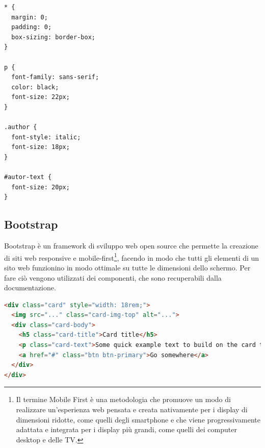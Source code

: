 \begin{lstlisting}[basicstyle=\small, caption={Esempio di utilizzo dei selettori usando CSS}, captionpos=b]
* {
  margin: 0;
  padding: 0;
  box-sizing: border-box;
}

p {
  font-family: sans-serif;
  color: black;
  font-size: 22px;
}

.author {
  font-style: italic;
  font-size: 18px;
}

#autor-text {
  font-size: 20px;
}

\end{lstlisting}

\subsection{Bootstrap}
Bootstrap è un framework di sviluppo web open source che permette la creazione di siti web responsive e mobile-first\footnote{Il termine Mobile First è una metodologia che promuove un modo di realizzare un’esperienza web pensata e creata nativamente per i display di dimensioni ridotte, come quelli degli smartphone e che viene progressivamente adattata e integrata per i display più grandi, come quelli dei computer desktop e delle TV.\cite{mobileFirst}}, facendo in modo che tutti gli elementi di un sito web funzionino in modo ottimale su tutte le dimensioni dello schermo.\cite{bootstrap}
Per fare ciò vengono utilizzati dei componenti, che sono recuperabili dalla documentazione.
\begin{lstlisting}[language=html, basicstyle=\small, caption={Esempio di un componente di Bootstrap (card)}, captionpos=b]
<div class="card" style="width: 18rem;">
  <img src="..." class="card-img-top" alt="...">
  <div class="card-body">
    <h5 class="card-title">Card title</h5>
    <p class="card-text">Some quick example text to build on the card title and make up the bulk of the card's content.</p>
    <a href="#" class="btn btn-primary">Go somewhere</a>
  </div>
</div>
\end{lstlisting}
